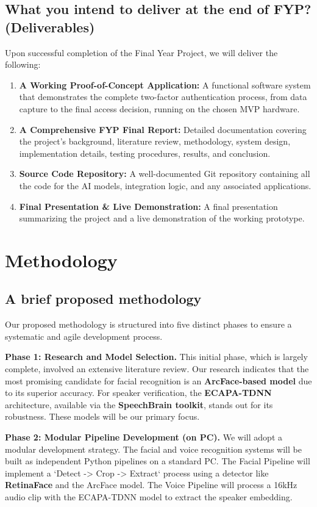 \documentclass[12pt, a4paper]{article}
\begin{document}
\subsection{What you intend to deliver at the end of FYP? (Deliverables)}
Upon successful completion of the Final Year Project, we will deliver the following:
\begin{enumerate}
    \item \textbf{A Working Proof-of-Concept Application:} A functional software system that demonstrates the complete two-factor authentication process, from data capture to the final access decision, running on the chosen MVP hardware.
    \item \textbf{A Comprehensive FYP Final Report:} Detailed documentation covering the project's background, literature review, methodology, system design, implementation details, testing procedures, results, and conclusion.
    \item \textbf{Source Code Repository:} A well-documented Git repository containing all the code for the AI models, integration logic, and any associated applications.
    \item \textbf{Final Presentation \& Live Demonstration:} A final presentation summarizing the project and a live demonstration of the working prototype.
\end{enumerate}

\section{Methodology}

\subsection{A brief proposed methodology}
Our proposed methodology is structured into five distinct phases to ensure a systematic and agile development process.

\textbf{Phase 1: Research and Model Selection.} This initial phase, which is largely complete, involved an extensive literature review. Our research indicates that the most promising candidate for facial recognition is an \textbf{ArcFace-based model} due to its superior accuracy. For speaker verification, the \textbf{ECAPA-TDNN} architecture, available via the \textbf{SpeechBrain toolkit}, stands out for its robustness. These models will be our primary focus.

\textbf{Phase 2: Modular Pipeline Development (on PC).} We will adopt a modular development strategy. The facial and voice recognition systems will be built as independent Python pipelines on a standard PC. The Facial Pipeline will implement a `Detect -> Crop -> Extract` process using a detector like \textbf{RetinaFace} and the ArcFace model. The Voice Pipeline will process a 16kHz audio clip with the ECAPA-TDNN model to extract the speaker embedding.
\end{document}
